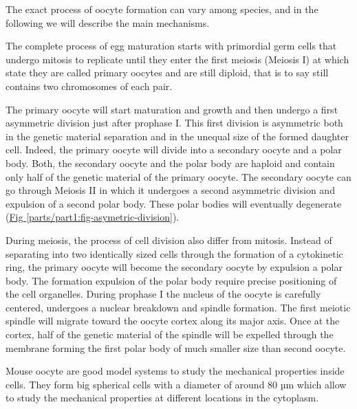 \documentclass[A4paperpaper,11pt,english]{sphinxmanual}
\begin{document}
The exact process of oocyte formation can vary among species, and in the following we will
describe the main mechanisms.

The complete process of egg maturation starts with primordial germ cells that
undergo mitosis to replicate until they enter the first meiosis (Meiosis I)
at which state they are called primary oocytes and are still diploid, that is to say still contains two chromosomes of each pair.

The primary oocyte will start maturation and growth and then undergo a first
asymmetric division just after prophase I.  This first division is asymmetric
both in the genetic material separation and in the unequal size of the formed
daughter cell. Indeed, the primary oocyte will divide into a secondary oocyte
and a polar body. Both, the secondary oocyte and the polar body are haploid and contain
only half of the genetic material of the primary oocyte.  The secondary oocyte
can go through Meiosis II in which it undergoes a second asymmetric division
and expulsion of a second polar body. These polar bodies will eventually degenerate
(\hyperref[parts/part1:fig-asymetric-division]{Fig  \ref*{parts/part1:fig-asymetric-division}}).

During meiosis, the process of cell division also differ from mitosis. Instead
of separating into two identically sized cells through the formation of a
cytokinetic ring, the primary oocyte will become the secondary oocyte by
expulsion a polar body. The formation expulsion of the polar body require
precise positioning of the cell organelles. During prophase I the nucleus of
the oocyte is carefully centered, undergoes a nuclear breakdown and spindle formation.
The first meiotic spindle will migrate toward the oocyte cortex along
its major axis. Once at the cortex, half of the genetic material of the spindle
will be expelled through the membrane forming the first polar body of much
smaller size than second oocyte.

Mouse oocyte are good model systems to study the mechanical properties inside
cells. They form big spherical cells with a diameter of around 80 µm
which allow to study the mechanical properties at different locations in
the cytoplasm.
\end{document}
